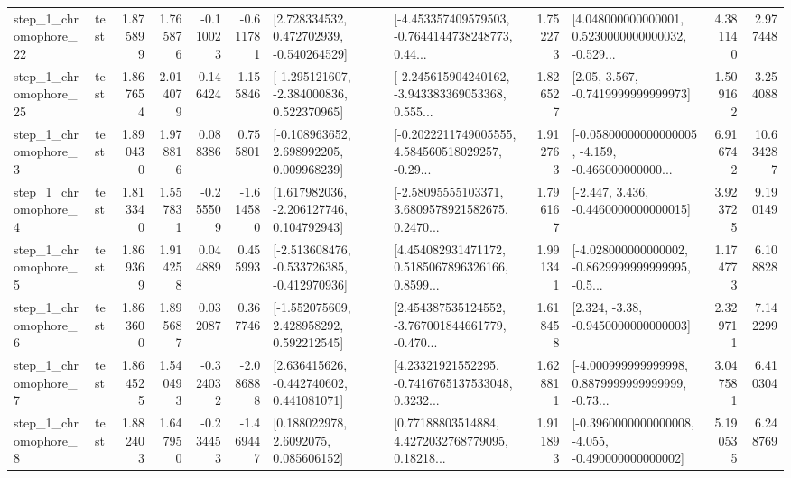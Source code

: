 \begin{tabular}{llrrrrllrlrr}
    step\_1\_chromophore\_22 &      test &      1.875899 &    1.765876 &     -0.110023 & -0.611781 &    [2.728334532, 0.472702939, -0.540264529] &  [-4.453357409579503, -0.7644144738248773, 0.44... &       1.752273 &  [4.048000000000001, 0.5230000000000032, -0.529... &            4.381140 &          2.977448 \\
    step\_1\_chromophore\_25 &      test &      1.867654 &    2.014079 &      0.146424 &  1.155846 &   [-1.295121607, -2.384000836, 0.522370965] &  [-2.245615904240162, -3.943383369053368, 0.555... &       1.826527 &                 [2.05, 3.567, -0.7419999999999973] &            1.509162 &          3.254088 \\
     step\_1\_chromophore\_3 &      test &      1.890430 &    1.978816 &      0.088386 &  0.755801 &    [-0.108963652, 2.698992205, 0.009968239] &  [-0.2022211749005555, 4.584560518029257, -0.29... &       1.912763 &  [-0.05800000000000005, -4.159, -0.466000000000... &            6.916742 &         10.634287 \\
     step\_1\_chromophore\_4 &      test &      1.813340 &    1.557831 &     -0.255509 & -1.614580 &    [1.617982036, -2.206127746, 0.104792943] &  [-2.58095555103371, 3.6809578921582675, 0.2470... &       1.796167 &               [-2.447, 3.436, -0.4460000000000015] &            3.923725 &          9.190149 \\
     step\_1\_chromophore\_5 &      test &      1.869369 &    1.914258 &      0.044889 &  0.455993 &  [-2.513608476, -0.533726385, -0.412970936] &  [4.454082931471172, 0.5185067896326166, 0.8599... &       1.991341 &  [-4.028000000000002, -0.8629999999999995, -0.5... &            1.174773 &          6.108828 \\
     step\_1\_chromophore\_6 &      test &      1.863600 &    1.895687 &      0.032087 &  0.367746 &    [-1.552075609, 2.428958292, 0.592212545] &  [2.454387535124552, -3.767001844661779, -0.470... &       1.618458 &                [2.324, -3.38, -0.9450000000000003] &            2.329711 &          7.142299 \\
     step\_1\_chromophore\_7 &      test &      1.864525 &    1.540493 &     -0.324032 & -2.086888 &    [2.636415626, -0.442740602, 0.441081071] &  [4.23321921552295, -0.7416765137533048, 0.3232... &       1.628811 &  [-4.000999999999998, 0.8879999999999999, -0.73... &            3.047581 &          6.410304 \\
     step\_1\_chromophore\_8 &      test &      1.882403 &    1.647950 &     -0.234453 & -1.469447 &       [0.188022978, 2.6092075, 0.085606152] &  [0.77188803514884, 4.4272032768779095, 0.18218... &       1.911893 &  [-0.3960000000000008, -4.055, -0.490000000000002] &            5.190535 &          6.248769 \\

\end{tabular}
